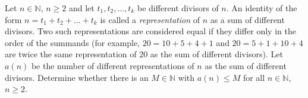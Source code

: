 Let $n \in \mathbb{N}$, $n \geq 2$ and let $t_1,t_2,\ldots,t_k$ be different divisors of $n$.
An identity of the form $n=t_1+t_2+ \ldots +t_k$ is called a \emph{representation} of $n$ as a
sum of different divisors. Two such representations are considered equal if they differ only in
the order of the summands (for example, $20=10+5+4+1$ and $20=5+1+10+4$ are twice the
same representation of $20$ as the sum of different divisors).
Let $a(n)$ be the number of different representations of $n$ as the sum of different divisors.
Determine whether there is an $M \in \mathbb{N}$ with $a(n)\leq M$ for all $n \in \mathbb{N}$, $n\geq 2$.
